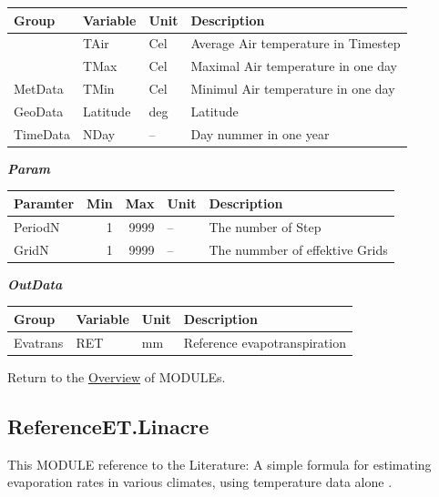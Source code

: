 \documentclass[
]{book}
\begin{document}
\begin{table}[!h]
\centering
\begin{tabular}{l|l|l|l}
\hline
Group & Variable & Unit & Description\\
\hline
 & TAir & Cel & Average Air temperature in Timestep\\
\cline{2-4}
 & TMax & Cel & Maximal Air temperature in one day\\
\cline{2-4}
\multirow{-3}{*}{\raggedright\arraybackslash MetData} & TMin & Cel & Minimul Air temperature in one day\\
\cline{1-4}
GeoData & Latitude & deg & Latitude\\
\cline{1-4}
TimeData & NDay & -- & Day nummer in one year\\
\hline
\end{tabular}
\end{table}

\textbf{\emph{Param}}

\begin{table}[!h]
\centering
\begin{tabular}{l|r|r|l|l}
\hline
Paramter & Min & Max & Unit & Description\\
\hline
PeriodN & 1 & 9999 & -- & The number of Step\\
\cline{1-5}
GridN & 1 & 9999 & -- & The nummber of effektive Grids\\
\hline
\end{tabular}
\end{table}

\textbf{\emph{OutData}}

\begin{table}[!h]
\centering
\begin{tabular}{l|l|l|l}
\hline
Group & Variable & Unit & Description\\
\hline
Evatrans & RET & mm & Reference evapotranspiration\\
\hline
\end{tabular}
\end{table}

Return to the \protect\hyperlink{module}{Overview} of MODULEs.

\hypertarget{ReferenceET.Linacre}{%
\subsection{ReferenceET.Linacre}\label{ReferenceET.Linacre}}

This MODULE reference to the Literature: A simple formula for estimating evaporation rates in various climates, using temperature data alone \citep{Linacre.1977}.
\end{document}
